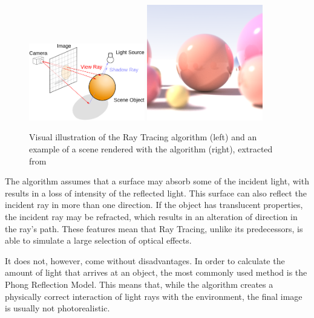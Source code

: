 \begin{figure}[h]
  \centering
  \includegraphics[width=0.45\textwidth,height=\textheight,keepaspectratio]{images/3_theoretical_foundations/raytracing.png}
  \includegraphics[width=0.45\textwidth,height=\textheight,keepaspectratio]{images/3_theoretical_foundations/raytracingexample.png}
  \caption{Visual illustration of the Ray Tracing algorithm (left) and an example of a scene rendered with the algorithm (right), extracted from \cite{wiki:raytracing}}
  \label{fig:raytracing}
\end{figure}


The algorithm assumes that a surface may absorb some of the incident light, with results in a loss of intensity of the reflected light. This surface can also reflect the incident ray in more than one direction. If the object has translucent properties, the incident ray may be refracted, which results in an alteration of direction in the ray's path. These features mean that Ray Tracing, unlike its predecessors, is able to simulate a large selection of optical effects. 

It does not, however, come without disadvantages. In order to calculate the amount of light that arrives at an object, the most commonly used method is the Phong Reflection Model. This means that, while the algorithm creates a physically correct interaction of light rays with the environment, the final image is usually not photorealistic.

